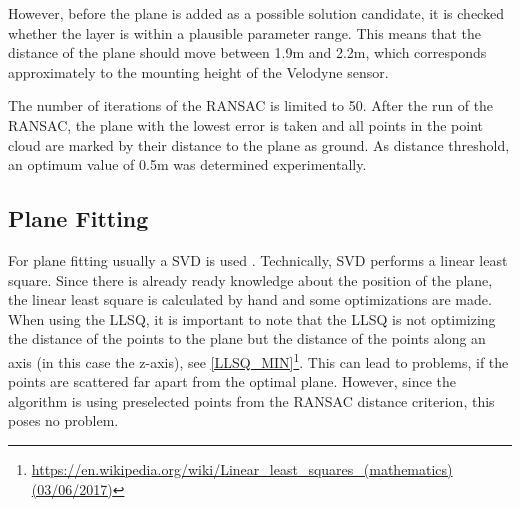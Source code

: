 \documentclass[11pt,oneside,openright]{mpreport}
\begin{document}
However, before the plane is added as a possible solution candidate, it is checked whether the layer is within a plausible parameter range.
This means that the distance of the plane should move between 1.9m and 2.2m, which corresponds approximately to the mounting height of the Velodyne sensor.

The number of iterations of the \ac{RANSAC} is limited to 50. After the run of the \ac{RANSAC}, the plane with the lowest error is taken and all points in the
point cloud are marked by their distance to the plane as ground. As distance threshold, an optimum value of 0.5m was determined experimentally.


\subsection{Plane Fitting}
\label{subssec:planefitting}



For plane fitting usually a \ac{SVD} is used \cite{Nurunnabi2012,Ram2007,Soderkvist2009}. Technically, SVD performs a linear least square\cite{Lee2012}.
Since there is already ready knowledge about the position of the plane, the linear least square is calculated by hand and some optimizations are made.
When using the \ac{LLSQ}, it is important to note that the \ac{LLSQ} is not optimizing the distance of the points to the plane but the distance of the points along an axis (in this case the z-axis),
see \cref{LLSQ_MIN}\footnote{\url{https://en.wikipedia.org/wiki/Linear_least_squares_(mathematics) (03/06/2017)}}. This can lead to problems, if the points are scattered far apart from the optimal plane.
However, since the algorithm is using preselected points from the \ac{RANSAC} distance criterion, this poses no problem.
\end{document}
